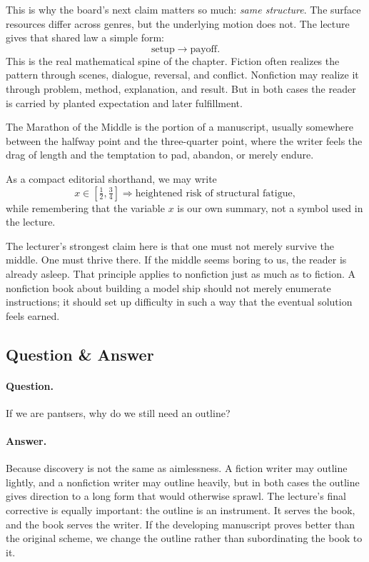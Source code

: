 This is why the board's next claim matters so much: \textit{same structure}. The surface resources differ across genres, but the underlying motion does not. The lecture gives that shared law a simple form:
\begin{equation}
\text{setup} \to \text{payoff}.
\end{equation}
This is the real mathematical spine of the chapter. Fiction often realizes the pattern through scenes, dialogue, reversal, and conflict. Nonfiction may realize it through problem, method, explanation, and result. But in both cases the reader is carried by planted expectation and later fulfillment.

\begin{definition}
The Marathon of the Middle is the portion of a manuscript, usually somewhere between the halfway point and the three-quarter point, where the writer feels the drag of length and the temptation to pad, abandon, or merely endure.
\end{definition}

As a compact editorial shorthand, we may write
\begin{equation}
x \in \left[\tfrac12,\tfrac34\right] \Rightarrow \text{heightened risk of structural fatigue},
\end{equation}
while remembering that the variable \(x\) is our own summary, not a symbol used in the lecture.

The lecturer's strongest claim here is that one must not merely survive the middle. One must thrive there. If the middle seems boring to us, the reader is already asleep. That principle applies to nonfiction just as much as to fiction. A nonfiction book about building a model ship should not merely enumerate instructions; it should set up difficulty in such a way that the eventual solution feels earned.

\subsection{Question \& Answer}

\paragraph{Question.} If we are pantsers, why do we still need an outline?

\paragraph{Answer.} Because discovery is not the same as aimlessness. A fiction writer may outline lightly, and a nonfiction writer may outline heavily, but in both cases the outline gives direction to a long form that would otherwise sprawl. The lecture's final corrective is equally important: the outline is an instrument. It serves the book, and the book serves the writer. If the developing manuscript proves better than the original scheme, we change the outline rather than subordinating the book to it.

